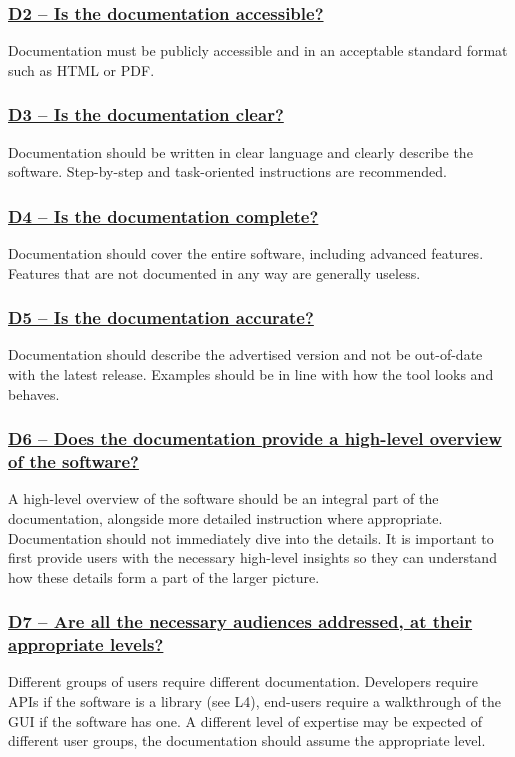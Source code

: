 \documentclass[a4paper,11pt]{article}
\newcommand{\indicator}[1]{\subsubsection*{\underline{#1}}}
\begin{document}
 \indicator{D2 -- Is the documentation accessible?}

Documentation must be publicly accessible and in an acceptable standard format
such as HTML or PDF.

\indicator{D3 -- Is the documentation clear?}

Documentation should be written in clear language and clearly describe the software.
Step-by-step and task-oriented instructions are recommended.

\indicator{D4 -- Is the documentation complete?}

Documentation should cover the entire software, including advanced features.
Features that are not documented in any way are generally useless. 

%
%
%

\indicator{D5 -- Is the documentation accurate?}

Documentation should describe the advertised version and not be out-of-date
with the latest release. Examples should be in line with how the tool looks and
behaves.

\indicator{D6 -- Does the documentation provide a high-level overview of the software?}

A high-level overview of the software should be an integral part of the
documentation, alongside more detailed instruction where appropriate.
Documentation should not immediately dive into the details. It is important to
first provide users with the necessary high-level insights so they can understand how
these details form a part of the larger picture.


\indicator{D7 -- Are all the necessary audiences addressed, at their appropriate levels?}

Different groups of users require different documentation. Developers require
APIs if the software is a library (see L4), end-users require a walkthrough of the GUI
if the software has one. A different level of expertise may be expected of
different user groups, the documentation should assume the appropriate level.
\end{document}
